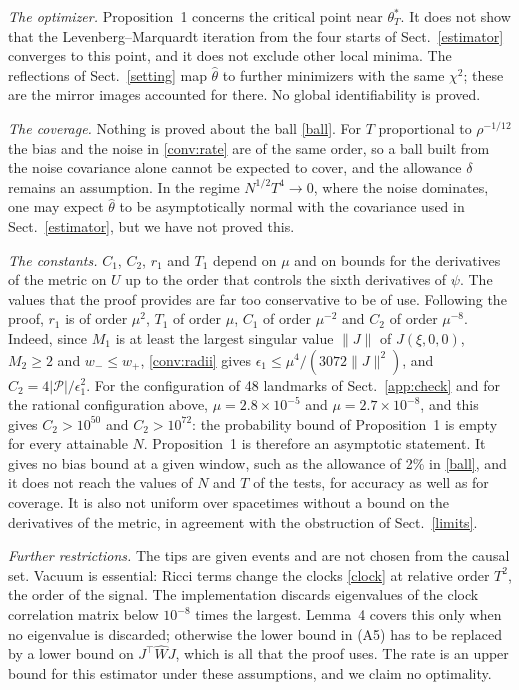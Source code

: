\emph{The optimizer.} Proposition~1 concerns the critical point near
$\theta^*_T$. It does not show that the Levenberg--Marquardt iteration from
the four starts of Sect.~\ref{estimator} converges to this point, and it
does not exclude other local minima. The reflections of
Sect.~\ref{setting} map $\hat\theta$ to further minimizers with the same
$\chi^2$; these are the mirror images accounted for there. No global
identifiability is proved.

\emph{The coverage.} Nothing is proved about the ball \eqref{ball}. For
$T$ proportional to $\rho^{-1/12}$ the bias and the noise in
\eqref{conv:rate} are of the same order, so a ball built from the noise
covariance alone cannot be expected to cover, and the allowance $\delta$
remains an assumption. In the regime $N^{1/2}T^4\to0$, where the noise
dominates, one may expect $\hat\theta$ to be asymptotically normal with the
covariance used in Sect.~\ref{estimator}, but we have not proved this.

\emph{The constants.} $C_1$, $C_2$, $r_1$ and $T_1$ depend on $\mu$ and on
bounds for the derivatives of the metric on $U$ up to the order that
controls the sixth derivatives of $\psi$. The values that the proof
provides are far too conservative to be of use. Following the proof, $r_1$
is of order $\mu^2$, $T_1$ of order $\mu$, $C_1$ of order $\mu^{-2}$ and
$C_2$ of order $\mu^{-8}$. Indeed, since $M_1$ is at least the largest
singular value $\|J\|$ of $J(\xi,0,0)$, $M_2\ge2$ and $w_-\le w_+$,
\eqref{conv:radii} gives $\epsilon_1\le\mu^4/(3072\|J\|^2)$, and
$C_2=4|\mathcal P|/\epsilon_1^2$. For the configuration of 48 landmarks of
Sect.~\ref{app:check} and for the rational configuration above,
$\mu=2.8\times10^{-5}$ and $\mu=2.7\times10^{-8}$, and this gives
$C_2>10^{50}$ and $C_2>10^{72}$: the probability bound of Proposition~1 is
empty for every attainable $N$. Proposition~1 is therefore
an asymptotic statement. It gives no bias bound at a given window, such as
the allowance of 2\% in \eqref{ball}, and it does not reach the values of
$N$ and $T$ of the tests, for accuracy as well as for coverage. It is also
not uniform over spacetimes without a bound on the derivatives of the
metric, in agreement with the obstruction of Sect.~\ref{limits}.

\emph{Further restrictions.} The tips are given events and are not chosen
from the causal set. Vacuum is essential: Ricci terms change the clocks
\eqref{clock} at relative order $T^2$, the order of the signal. The
implementation discards eigenvalues of the clock correlation matrix below
$10^{-8}$ times the largest. Lemma~4 covers this only when no eigenvalue is
discarded; otherwise the lower bound in (A5) has to be replaced by a lower
bound on $J^{\!\top}\widehat WJ$, which is all that the proof uses. The rate
is an upper bound for this estimator under these assumptions, and we claim
no optimality.


